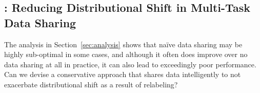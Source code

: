 

\vspace{-5pt}
\subsection{\cdsmethodname: Reducing Distributional Shift in Multi-Task Data Sharing}
\label{sec:method}
\vspace{-5pt}
The analysis in Section~\ref{sec:analysis} shows that na\"ive data sharing may be highly sub-optimal in some cases, and although it often does improve over no data sharing at all in practice, it can also lead to exceedingly poor performance. Can we devise a conservative approach that shares data intelligently to not exacerbate distributional shift as a result of relabeling?

